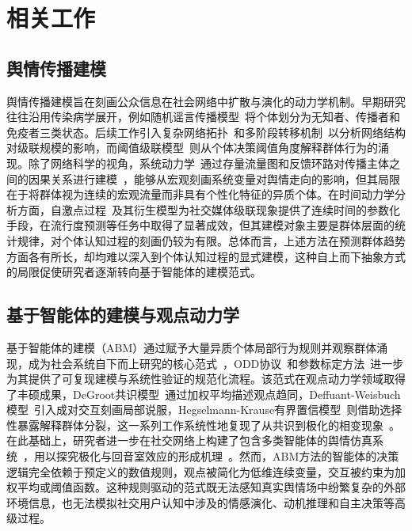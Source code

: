 \documentclass[a4paper,fleqn]{cas-dc}
\begin{document}
\section{相关工作}\label{sec:related}

\subsection{舆情传播建模}
舆情传播建模旨在刻画公众信息在社会网络中扩散与演化的动力学机制。早期研究往往沿用传染病学展开，例如随机谣言传播模型~\citep{daley_stochastic_1965}将个体划分为无知者、传播者和免疫者三类状态。后续工作引入复杂网络拓扑~\citep{watts_strogatz_1998,barabasi_albert_1999}和多阶段转移机制~\citep{jiang_weibo_spnr_2020}以分析网络结构对级联规模的影响，而阈值级联模型~\citep{granovetter_threshold_1978,watts_cascades_2002}则从个体决策阈值角度解释群体行为的涌现。除了网络科学的视角，系统动力学~\citep{forrester_industrial_1961,sterman_business_2000}通过存量流量图和反馈环路对传播主体之间的因果关系进行建模~\citep{gao_sd_public_opinion_2019,liu_evolution_2024}，能够从宏观刻画系统变量对舆情走向的影响，但其局限在于将群体视为连续的宏观流量而非具有个性化特征的异质个体。在时间动力学分析方面，自激点过程~\citep{hawkes_spectra_1971}及其衍生模型为社交媒体级联现象提供了连续时间的参数化手段，在流行度预测等任务中取得了显著成效，但其建模对象主要是群体层面的统计规律，对个体认知过程的刻画仍较为有限。总体而言，上述方法在预测群体趋势方面各有所长，却均难以深入到个体认知过程的显式建模，这种自上而下抽象方式的局限促使研究者逐渐转向基于智能体的建模范式。

\subsection{基于智能体的建模与观点动力学}

基于智能体的建模（ABM）通过赋予大量异质个体局部行为规则并观察群体涌现，成为社会系统自下而上研究的核心范式~\citep{bonabeau_agent-based_2002,macal_tutorial_2010}，ODD协议~\citep{grimm_odd_2010}和参数标定方法~\citep{mcculloch_calibrating_2022}进一步为其提供了可复现建模与系统性验证的规范化流程。该范式在观点动力学领域取得了丰硕成果，DeGroot共识模型~\citep{degroot_reaching_1974}通过加权平均描述观点趋同，Deffuant-Weisbuch模型~\citep{deffuant_mixing_2000}引入成对交互刻画局部说服，Hegselmann-Krause有界置信模型~\citep{hegselmann_opinion_2002}则借助选择性暴露解释群体分裂，这一系列工作系统性地复现了从共识到极化的相变现象~\citep{castellano_statistical_2009,bernardo_bc_survey_2024}。在此基础上，研究者进一步在社交网络上构建了包含多类智能体的舆情仿真系统~\citep{chen_evolution_2025,wu_public_2023}，用以探究极化与回音室效应的形成机理~\citep{liu_agent-based_2024,banisch_agent_2012,cinelli2021echo_ipm}。然而，ABM方法的智能体的决策逻辑完全依赖于预定义的数值规则，观点被简化为低维连续变量，交互被约束为加权平均或阈值函数。这种规则驱动的范式既无法感知真实舆情场中纷繁复杂的外部环境信息，也无法模拟社交用户认知中涉及的情感演化、动机推理和自主决策等高级过程。
\end{document}
